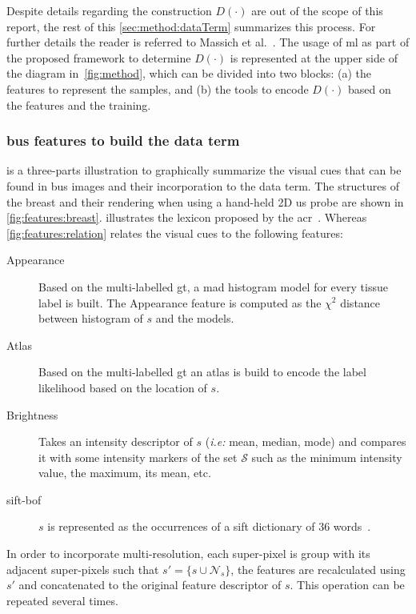 Despite details regarding the construction $D(\cdot)$ are out of the scope of this report, the rest of this \cref{sec:method:dataTerm} summarizes this process.
For further details the reader is referred to Massich et al.~\cite{massich2013phd}.
The usage of \ac{ml} as part of the proposed framework to determine $D(\cdot)$ is represented at the upper side of the diagram in~\cref{fig:method},
which can be divided into two blocks:
(a) the features to represent the samples,
and (b) the tools to encode $D(\cdot)$ based on the features and the training. 

\subsubsection{\ac{bus} features to build the data term} \label{sec:method:dterm:feat}
 is a three-parts illustration to graphically summarize the visual cues that can be found in \ac{bus} images and their incorporation to the data term.
The structures of the breast and their rendering when using a hand-held 2D \ac{us} probe are shown in \cref{fig:features:breast}.
 illustrates the lexicon proposed by the \ac{acr}~\cite{biradsus}.
Whereas \cref{fig:features:relation} relates the visual cues to the following features:

\begin{description}
  \item[Appearance] 
    Based on the multi-labelled \ac{gt}, a \ac{mad} histogram model for every tissue label is built. The Appearance feature is computed as the $\chi^2$ distance between histogram of $s$ and the models.
  \item[Atlas] 
    Based on the multi-labelled \ac{gt} an atlas is build to encode the label likelihood based on the location of $s$.
  \item[Brightness] 
    Takes an intensity descriptor of $s$ (\emph{i.e:} mean, median, mode) and compares it with some intensity markers of the set $\mathcal{S}$ such as the minimum intensity value, the maximum, its mean, etc.
  \item[\ac{sift}-\ac{bof}]
    $s$ is represented as the occurrences of a \ac{sift} dictionary of 36 words~\cite{massich2014sift}.
\end{description}

In order to incorporate multi-resolution, each super-pixel is group with its adjacent super-pixels such that $s' = \{s \cup \mathcal{N}_{s}\}$, the features are recalculated using $s'$ and concatenated to the original feature descriptor of $s$.
This operation can be repeated several times.

